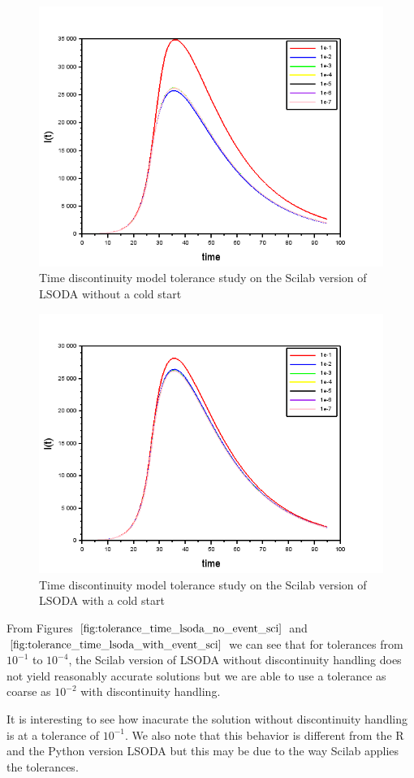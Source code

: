 \begin{figure}[H]
\centering
\includegraphics[width=0.7\linewidth]{./figures/tolerance_time_lsoda_no_event_sci}
\caption{Time discontinuity model tolerance study on the Scilab version of LSODA without a cold start}
\label{fig:tolerance_time_lsoda_no_event_sci}
\end{figure}

\begin{figure}[H]
\centering
\includegraphics[width=0.7\linewidth]{./figures/tolerance_time_lsoda_with_event_sci}
\caption{Time discontinuity model tolerance study on the Scilab version of LSODA with a cold start}
\label{fig:tolerance_time_lsoda_with_event_sci}
\end{figure}

From Figures $\ref{fig:tolerance_time_lsoda_no_event_sci}$ and $\ref{fig:tolerance_time_lsoda_with_event_sci}$ we can see that for tolerances from $10^{-1}$ to $10^{-4}$, the Scilab version of LSODA without discontinuity handling does not yield reasonably accurate solutions but we are able to use a tolerance as coarse as $10^{-2}$ with discontinuity handling. 

It is interesting to see how inacurate the solution without discontinuity handling is at a tolerance of $10^{-1}$. We also note that this behavior is different from the R and the Python version LSODA but this may be due to the way Scilab applies the tolerances.

